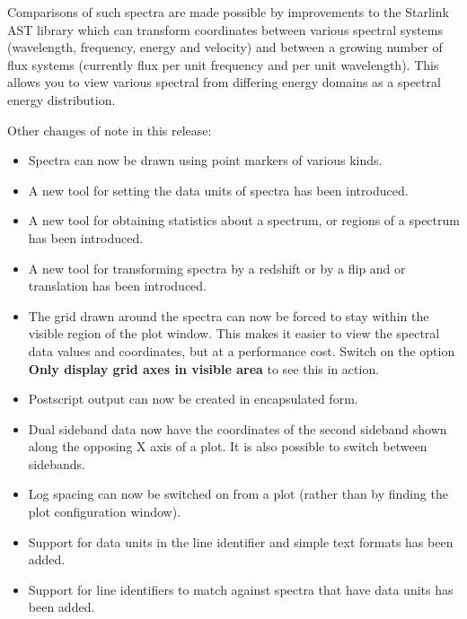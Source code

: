 \documentclass[twoside,11pt]{article}
\renewcommand{\_}{\texttt{\symbol{95}}}
\newcommand{\labelitem}[1]{\textbf{#1}}
\begin{document}
Comparisons of such spectra are made possible by improvements to the
Starlink AST library which can transform coordinates between various
spectral systems (wavelength, frequency, energy and velocity) and between a
growing number of flux systems (currently flux per unit frequency and per
unit wavelength). This allows you to view various spectral from differing
energy domains as a spectral energy distribution.

Other changes of note in this release:
\begin{itemize}
\item Spectra can now be drawn using point markers of various kinds.

\item A new tool for setting the data units of spectra has been introduced.

\item A new tool for obtaining statistics about a spectrum, or regions of a
      spectrum has been introduced.

\item A new tool for transforming spectra by a redshift or by a flip and or
      translation has been introduced.

\item The grid drawn around the spectra can now be forced to stay within
      the visible region of the plot window. This makes it easier to view
      the spectral data values and coordinates, but at a performance cost.
      Switch on the option \labelitem{Only display grid axes in visible area}
      to see this in action.

\item Postscript output can now be created in encapsulated form.

\item Dual sideband data now have the coordinates of the second sideband
      shown along the opposing X axis of a plot. It is also possible to
      switch between sidebands.

\item Log spacing can now be switched on from a plot (rather than by finding
      the plot configuration window).

\item Support for data units in the line identifier and simple text formats
      has been added.

\item Support for line identifiers to match against spectra that have data
      units has been added.


\end{itemize}
\end{document}
